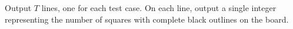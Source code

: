 \documentclass{article}
\begin{document}
Output $T$ lines, one for each test case. On each line, output a single integer representing the number of squares with complete black outlines on the board.
\end{document}
